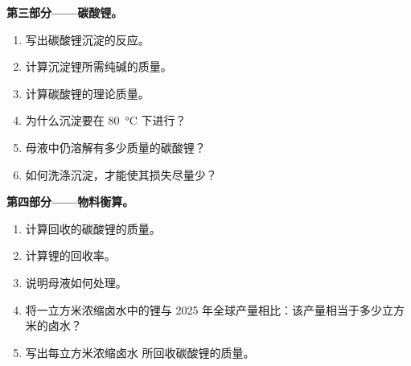\begin{problem}
\medskip
\noindent\textbf{第三部分——碳酸锂。}
\begin{enumerate}[resume]
  \item 写出碳酸锂沉淀的反应。
  \item 计算沉淀锂所需纯碱的质量。
  \item 计算碳酸锂的理论质量。
  \item 为什么沉淀要在 \qty{80}{\celsius} 下进行？
  \item 母液中仍溶解有多少质量的碳酸锂？
  \item 如何洗涤沉淀，才能使其损失尽量少？
\end{enumerate}

\medskip
\noindent\textbf{第四部分——物料衡算。}
\begin{enumerate}[resume]
  \item 计算回收的碳酸锂的质量。
  \item 计算锂的回收率。
  \item 说明母液如何处理。
  \item 将一立方米浓缩卤水中的锂与
        2025 年全球产量相比：该产量相当于多少立方米的卤水？
  \item 写出每立方米浓缩卤水
        所回收碳酸锂的质量。
\end{enumerate}
\end{problem}
